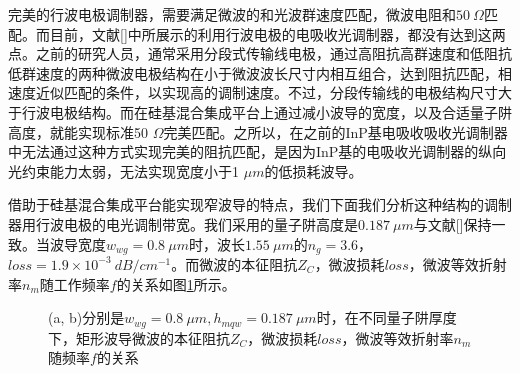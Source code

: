 完美的行波电极调制器，需要满足微波的和光波群速度匹配，微波电阻和$50~\Omega$匹配。而目前，文献[]中所展示的利用行波电极的电吸收光调制器，都没有达到这两点。之前的研究人员，通常采用分段式传输线电极，通过高阻抗高群速度和低阻抗低群速度的两种微波电极结构在小于微波波长尺寸内相互组合，达到阻抗匹配，相速度近似匹配的条件，以实现高的调制速度\cite{tang2012over,yuphd,Robertphd}。不过，分段传输线的电极结构尺寸大于行波电极结构。而在硅基混合集成平台上通过减小波导的宽度，以及合适量子阱高度，就能实现标准50 $\Omega$完美匹配。之所以，在之前的InP基电吸收吸收光调制器中无法通过这种方式实现完美的阻抗匹配，是因为InP基的电吸收光调制器的纵向光约束能力太弱，无法实现宽度小于1 $\mu m$的低损耗波导。

借助于硅基混合集成平台能实现窄波导的特点，我们下面我们分析这种结构的调制器用行波电极的电光调制带宽。我们采用的量子阱高度是$0.187~ \mu m$与文献[]保持一致。当波导宽度$w_{wg} = 0.8~ \mu m$时，波长$1.55~ \mu m$的$n_g = 3.6$， $loss = 1.9 \times 10^{-3} ~dB/cm^{-1} $。而微波的本征阻抗$Z_C$，微波损耗$loss$，微波等效折射率$n_m$随工作频率$f$的关系如图\ref{fig_ch2_rect_freq_property}所示。
\begin{figure}[htb]
	\small
\caption{(a, b)分别是$w_{wg} = 0.8 ~\mu m, h_{mqw} = 0.187 ~\mu m$时，在不同量子阱厚度下，矩形波导微波的本征阻抗$Z_C$，微波损耗$loss$，微波等效折射率$n_m$随频率$f$的关系}
\label{fig_ch2_rect_freq_property}	
\end{figure}

